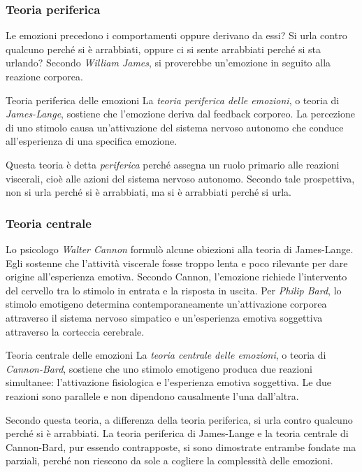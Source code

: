 \documentclass[a4paper]{article}
\begin{document}
\subsubsection{Teoria periferica}
Le emozioni precedono i comportamenti oppure derivano da essi? Si urla contro qualcuno perché si è arrabbiati, oppure ci si sente arrabbiati perché si sta urlando?
Secondo \emph{William James}, si proverebbe un'emozione in seguito alla reazione corporea.
\begin{snippetdefinition}{Teoria periferica delle emozioni}
    La \emph{teoria periferica delle emozioni}, o teoria di \emph{James-Lange}, sostiene che l'emozione deriva dal feedback corporeo. La percezione di uno stimolo causa un'attivazione del sistema nervoso autonomo che conduce all'esperienza di una specifica emozione.
\end{snippetdefinition}
Questa teoria è detta \emph{periferica} perché assegna un ruolo primario alle reazioni viscerali, cioè alle azioni del sistema nervoso autonomo. Secondo tale prospettiva, non si urla perché si è arrabbiati, ma si è arrabbiati perché si urla.
\subsubsection{Teoria centrale}
Lo psicologo \emph{Walter Cannon} formulò alcune obiezioni alla teoria di James-Lange. Egli sostenne che l'attività viscerale fosse troppo lenta e poco rilevante per dare origine all'esperienza emotiva. Secondo Cannon, l'emozione richiede l'intervento del cervello tra lo stimolo in entrata e la risposta in uscita.
Per \emph{Philip Bard}, lo stimolo emotigeno determina contemporaneamente un'attivazione corporea attraverso il sistema nervoso simpatico e un'esperienza emotiva soggettiva attraverso la corteccia cerebrale.
\begin{snippetdefinition}{Teoria centrale delle emozioni}
    La \emph{teoria centrale delle emozioni}, o teoria di \emph{Cannon-Bard}, sostiene che uno stimolo emotigeno produca due reazioni simultanee: l'attivazione fisiologica e l'esperienza emotiva soggettiva. Le due reazioni sono parallele e non dipendono causalmente l'una dall'altra.
\end{snippetdefinition}
Secondo questa teoria, a differenza della teoria periferica, si urla contro qualcuno perché si è arrabbiati.
La teoria periferica di James-Lange e la teoria centrale di Cannon-Bard, pur essendo contrapposte, si sono dimostrate entrambe fondate ma parziali, perché non riescono da sole a cogliere la complessità delle emozioni.
\end{document}
